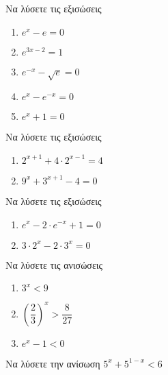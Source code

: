 \documentclass{../presentation}
\begin{document}
\begin{askisi}

  Να λύσετε τις εξισώσεις
  \begin{enumerate}
    \item<1-> $e^x-e=0$
    \item<2-> $e^{3x-2}=1$
    \item<3-> $e^{-x}-\sqrt{e}=0$
    \item<4-> $e^x-e^{-x}=0$
    \item<5-> $e^x+1=0$
  \end{enumerate}


\end{askisi}

\begin{askisi}
  Να λύσετε τις εξισώσεις
  \begin{enumerate}
    \item<1-> $2^{x+1}+4\cdot 2^{x-1}=4$
    \item<2-> $9^x+3^{x+1}-4=0$
  \end{enumerate}


\end{askisi}

\begin{askisi}
  Να λύσετε τις εξισώσεις
  \begin{enumerate}
    \item<1-> $e^x-2\cdot e^{-x}+1=0$
    \item<2-> $3\cdot 2^x-2\cdot 3^x=0$
  \end{enumerate}


\end{askisi}

\begin{askisi}
  Να λύσετε τις ανισώσεις
  \begin{enumerate}
    \item<1-> $3^x<9$
    \item<2-> $\left( \dfrac{2}{3} \right)^x > \dfrac{8}{27} $
    \item<3-> $e^x-1<0$
  \end{enumerate}


\end{askisi}

\begin{askisi}
  Να λύσετε την ανίσωση $5^x+5^{1-x}<6$


\end{askisi}
\end{document}
